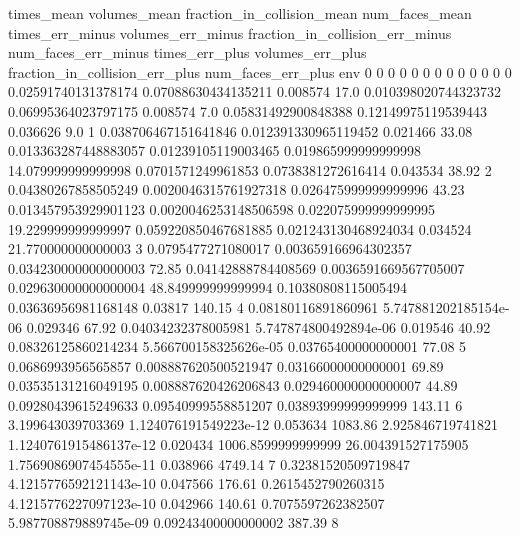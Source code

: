 times_mean	volumes_mean	fraction_in_collision_mean	num_faces_mean	times_err_minus	volumes_err_minus	fraction_in_collision_err_minus	num_faces_err_minus	times_err_plus	volumes_err_plus	fraction_in_collision_err_plus	num_faces_err_plus	env
0	0	0	0	0	0	0	0	0	0	0	0	0
0.02591740131378174	0.07088630434135211	0.008574	17.0	0.010398020744323732	0.06995364023797175	0.008574	7.0	0.05831492900848388	0.12149975119539443	0.036626	9.0	1
0.038706467151641846	0.012391330965119452	0.021466	33.08	0.013363287448883057	0.01239105119003465	0.019865999999999998	14.079999999999998	0.0701571249961853	0.0738381272616414	0.043534	38.92	2
0.04380267858505249	0.0020046315761927318	0.026475999999999996	43.23	0.013457953929901123	0.0020046253148506598	0.022075999999999995	19.229999999999997	0.059220850467681885	0.021243130468924034	0.034524	21.770000000000003	3
0.0795477271080017	0.003659166964302357	0.034230000000000003	72.85	0.04142888784408569	0.0036591669567705007	0.029630000000000004	48.849999999999994	0.10380808115005494	0.03636956981168148	0.03817	140.15	4
0.08180116891860961	5.747881202185154e-06	0.029346	67.92	0.04034232378005981	5.747874800492894e-06	0.019546	40.92	0.08326125860214234	5.566700158325626e-05	0.03765400000000001	77.08	5
0.0686993956565857	0.008887620500521947	0.03166000000000001	69.89	0.03535131216049195	0.008887620426206843	0.029460000000000007	44.89	0.09280439615249633	0.09540999558851207	0.03893999999999999	143.11	6
3.199643039703369	1.124076191549223e-12	0.053634	1083.86	2.925846719741821	1.1240761915486137e-12	0.020434	1006.8599999999999	26.004391527175905	1.7569086907454555e-11	0.038966	4749.14	7
0.32381520509719847	4.1215776592121143e-10	0.047566	176.61	0.2615452790260315	4.1215776227097123e-10	0.042966	140.61	0.7075597262382507	5.987708879889745e-09	0.09243400000000002	387.39	8
